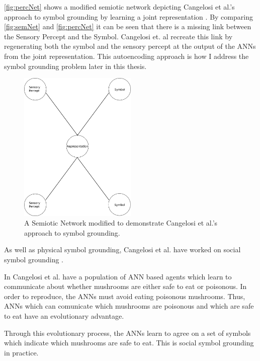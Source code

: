 \autoref{fig:percNet} shows a modified semiotic network depicting Cangelosi et al.'s approach to symbol grounding by learning a joint representation \cite{cangelosi2000robotic}. By comparing \autoref{fig:semNet} and \autoref{fig:percNet} it can be seen that there is a missing link between the Sensory Percept and the Symbol. Cangelosi et. al recreate this link by regenerating both the symbol and the sensory percept at the output of the \acp{ANN} from the joint representation. This autoencoding approach is how I address the symbol grounding problem later in this thesis.

\begin{figure}
\centering
\includegraphics[width=0.5\textwidth]{Figs/litReview/semioticNetPercept.png}
\caption{A Semiotic Network modified to demonstrate Cangelosi et al.'s approach to symbol grounding.}
\label{fig:percNet}

\end{figure}


As well as physical symbol grounding, Cangelosi et al. have worked on social symbol grounding \cite{cangelosi2001adaptive, cangelosi2002symbol, cangelosi1998emergence, horst2019object, cangelosi2018speech, cangelosi2008italk, broz2014italk}.

In \cite{cangelosi1998emergence} Cangelosi et al. have a population of \ac{ANN} based agents which learn to communicate about whether mushrooms are either safe to eat or poisonous. In order to reproduce, the \acp{ANN} must avoid eating poisonous mushrooms. Thus, \acp{ANN} which can comunicate which mushrooms are poisonous and which are safe to eat have an evolutionary advantage. 

Through this evolutionary process, the \acp{ANN} learn to agree on a set of symbols which indicate which mushrooms are safe to eat. This is social symbol grounding in practice. 

